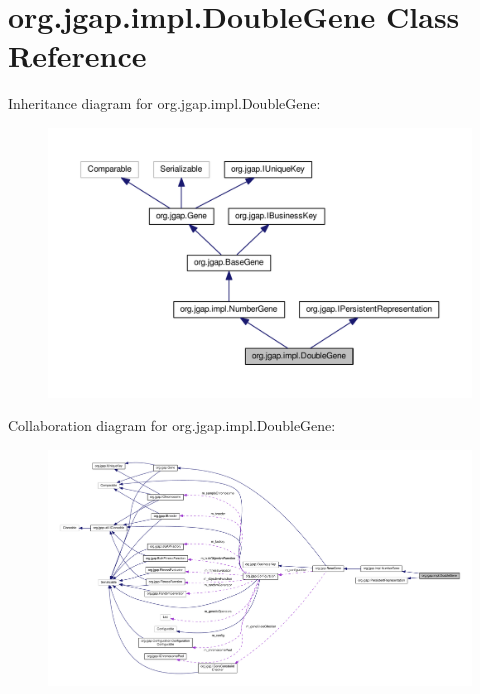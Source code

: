 \hypertarget{classorg_1_1jgap_1_1impl_1_1_double_gene}{\section{org.\-jgap.\-impl.\-Double\-Gene Class Reference}
\label{classorg_1_1jgap_1_1impl_1_1_double_gene}
}


Inheritance diagram for org.\-jgap.\-impl.\-Double\-Gene\-:
\nopagebreak
\begin{figure}[H]
\begin{center}
\leavevmode
\includegraphics[width=350pt]{classorg_1_1jgap_1_1impl_1_1_double_gene__inherit__graph}
\end{center}
\end{figure}


Collaboration diagram for org.\-jgap.\-impl.\-Double\-Gene\-:
\nopagebreak
\begin{figure}[H]
\begin{center}
\leavevmode
\includegraphics[width=350pt]{classorg_1_1jgap_1_1impl_1_1_double_gene__coll__graph}
\end{center}
\end{figure}
